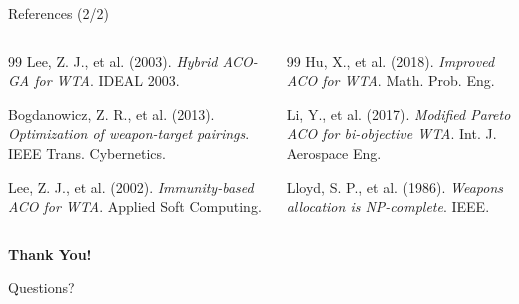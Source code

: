 \documentclass[aspectratio=43,8pt]{beamer}
\begin{document}
\begin{frame}{References (2/2)}
\begin{columns}[t]
\scriptsize
\begin{thebibliography}{99}
\setcounter{enumiv}{10}
Lee, Z. J., et al. (2003). \textit{Hybrid ACO-GA for WTA}. IDEAL 2003.

Bogdanowicz, Z. R., et al. (2013). \textit{Optimization of weapon-target pairings}. IEEE Trans. Cybernetics.

Lee, Z. J., et al. (2002). \textit{Immunity-based ACO for WTA}. Applied Soft Computing.
\end{thebibliography}

\scriptsize
\begin{thebibliography}{99}
\setcounter{enumiv}{13}
Hu, X., et al. (2018). \textit{Improved ACO for WTA}. Math. Prob. Eng.

Li, Y., et al. (2017). \textit{Modified Pareto ACO for bi-objective WTA}. Int. J. Aerospace Eng.

Lloyd, S. P., et al. (1986). \textit{Weapons allocation is NP-complete}. IEEE.
\end{thebibliography}
\end{columns}
\end{frame}

\begin{frame}[plain]
\begin{center}
\vspace{2cm}
{\Huge\textbf{\textcolor{primaryblue}{Thank You!}}}

\vspace{1cm}
{\Large Questions?}

\end{center}
\end{frame}
\end{document}
